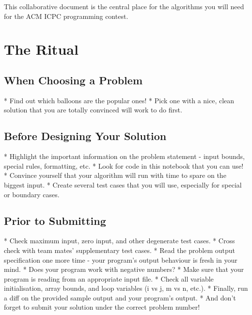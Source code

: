 \documentclass{article}
\title{\cTitle}
\author{\cAuthor}
\begin{document}
\maketitle


This collaborative document is the central place for the algorithms you will need for the ACM ICPC programming contest.

\tableofcontents



\clearpage
\section*{The Ritual}

\subsection*{When Choosing a Problem}

* Find out which balloons are the popular ones!
* Pick one with a nice, clean solution that you are totally convinced
will work to do first.

\subsection*{Before Designing Your Solution}

* Highlight the important information on the problem statement - input
bounds, special rules, formatting, etc.
* Look for code in this notebook that you can use!
* Convince yourself that your algorithm will run with time to spare on
the biggest input.
* Create several test cases that you will use, especially for special
or boundary cases.

\subsection*{Prior to Submitting}

* Check maximum input, zero input, and other degenerate test cases.
* Cross check with team mates' supplementary test cases.
* Read the problem output specification one more time - your program's
output behaviour is fresh in your mind.
* Does your program work with negative numbers?
* Make sure that your program is reading from an appropriate input file.
* Check all variable initialisation, array bounds, and loop variables
(i vs j, m vs n, etc.).
* Finally, run a diff on the provided sample output and your program's output.
* And don't forget to submit your solution under the correct problem number!
\end{document}
